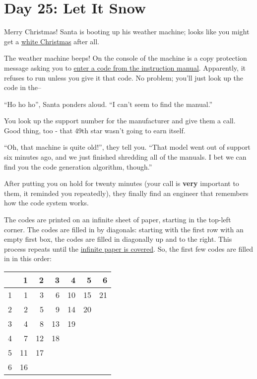 \newpage%
\section{Day 25: Let It Snow}

Merry Christmas! Santa is booting up his weather machine; looks like you might
get a \href{https://adventofcode.com/2015/day/1}{white Christmas} after all.

The weather machine beeps! On the console of the machine is a copy protection
message asking you to
\href{https://en.wikipedia.org/wiki/Copy_protection\#Early_video_games}{enter a
  code from the instruction manual}. Apparently, it refuses to run unless you
give it that code. No problem; you'll just look up the code in the--

``Ho ho ho'', Santa ponders aloud. ``I can't seem to find the manual.''

You look up the support number for the manufacturer and give them a call. Good
thing, too - that 49th star wasn't going to earn itself.

``Oh, that machine is quite old!'', they tell you. ``That model went out of
support six minutes ago, and we just finished shredding all of the manuals. I
bet we can find you the code generation algorithm, though.''

After putting you on hold for twenty minutes (your call is \textbf{very}
important to them, it reminded you repeatedly), they finally find an engineer
that remembers how the code system works.

The codes are printed on an infinite sheet of paper, starting in the top-left
corner. The codes are filled in by diagonals: starting with the first row with
an empty first box, the codes are filled in diagonally up and to the right. This
process repeats until the
\href{https://en.wikipedia.org/wiki/Cantor's_diagonal_argument}{infinite paper
  is covered}. So, the first few codes are filled in in this order:

\begin{table}[h]
  \centering
  \begin{tabular}{r|rrrrrr}
    & 1 & 2 & 3 & 4 & 5 & 6 \\
    \midrule
    1 & 1 & 3 & 6 & 10 & 15 & 21 \\
    2 & 2 & 5 & 9 & 14 & 20 \\
    3 & 4 & 8 & 13 & 19 \\
    4 & 7 & 12 & 18 \\
    5 & 11 & 17 \\
    6 & 16
  \end{tabular}
\end{table}

